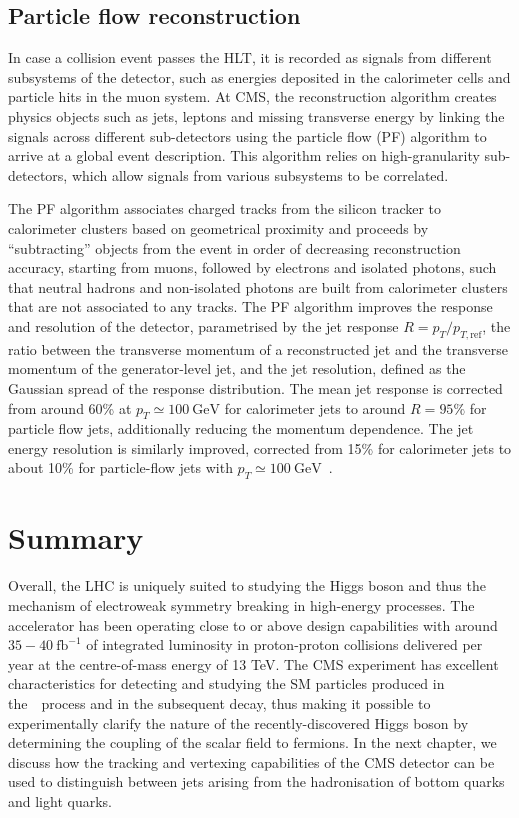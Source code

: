 \subsection{Particle flow reconstruction}
\label{sec:particleflow}
In case a collision event passes the HLT, it is recorded as signals from different subsystems of the detector, such as energies deposited in the calorimeter cells and particle hits in the muon system. At CMS, the reconstruction algorithm creates physics objects such as jets, leptons and missing transverse energy by linking the signals across different sub-detectors using the particle flow (PF) algorithm to arrive at a global event description. This algorithm relies on high-granularity sub-detectors, which allow signals from various subsystems to be correlated. 

The PF algorithm associates charged tracks from the silicon tracker to calorimeter clusters based on geometrical proximity and proceeds by ``subtracting'' objects from the event in order of decreasing reconstruction accuracy, starting from muons, followed by electrons and isolated photons, such that neutral hadrons and non-isolated photons are built from calorimeter clusters that are not associated to any tracks. The PF algorithm improves the response and resolution of the detector, parametrised by the jet response $R = p_T / p_{T,\mathrm{ref}}$, the ratio between the transverse momentum of a reconstructed jet and the transverse momentum of the generator-level jet, and the jet resolution, defined as the Gaussian spread of the response distribution. The mean jet response is corrected from around 60\% at $p_T \simeq 100~\mathrm{GeV}$ for calorimeter jets to around $R=95\%$ for particle flow jets, additionally reducing the momentum dependence. The jet energy resolution is similarly improved, corrected from 15\% for calorimeter jets to about 10\% for particle-flow jets with $p_T \simeq 100~\mathrm{GeV}$~\cite{cms_particleflow:2017}.

\section{Summary}
Overall, the LHC is uniquely suited to studying the Higgs boson and thus the mechanism of electroweak symmetry breaking in high-energy processes. The accelerator has been operating close to or above design capabilities with around $35-40~\mathrm{fb}^{-1}$ of integrated luminosity in proton-proton collisions delivered per year at the centre-of-mass energy of 13 TeV. The CMS experiment has excellent characteristics for detecting and studying the SM particles produced in the~\ttH~process and in the subsequent decay, thus making it possible to experimentally clarify the nature of the recently-discovered Higgs boson by determining the coupling of the scalar field to fermions. In the next chapter, we discuss how the tracking and vertexing capabilities of the CMS detector can be used to distinguish between jets arising from the hadronisation of bottom quarks and light quarks.

